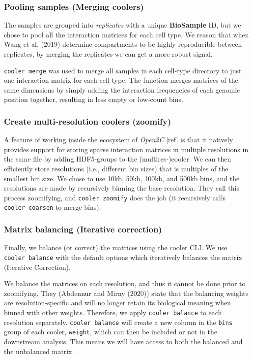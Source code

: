 \documentclass[
  11pt,
  a4paper,
]{scrbook}
\let\oldemph\emph
\renewcommand\emph[1]{\oldemph{\color{gray}#1}}
\begin{document}
\subsubsection{Pooling samples (Merging
coolers)}\label{pooling-samples-merging-coolers}

The samples are grouped into \emph{replicates} with a unique
\textbf{BioSample} ID, but we chose to pool all the interaction matrices
for each cell type. We reason that when Wang et al. (2019) determine
compartments to be highly reproducible between replicates, by merging
the replicates we can get a more robust signal.

\texttt{cooler\ merge} was used to merge all samples in each cell-type
directory to just one interaction matrix for each cell type. The
function merges matrices of the same dimensions by simply adding the
interaction frequencies of each genomic position together, resulting in
less empty or low-count bins.

\subsubsection{Create multi-resolution coolers
(zoomify)}\label{create-multi-resolution-coolers-zoomify}

A feature of working inside the ecosystem of \emph{Open2C} {[}ref{]} is
that it natively provides support for storing sparse interaction
matrices in multiple resolutions in the same file by adding HDF5-groups
to the (multires-)cooler. We can then efficiently store resolutions
(i.e., different bin sizes) that is multiples of the smallest bin size.
We chose to use 10kb, 50kb, 100kb, and 500kb bins, and the resolutions
are made by recursively binning the base resolution. They call this
process zoomifying, and \texttt{cooler\ zoomify} does the job (it
recursively calls \texttt{cooler\ coarsen} to merge bins).

\subsubsection{Matrix balancing (Iterative
correction)}\label{matrix-balancing-iterative-correction}

Finally, we balance (or correct) the matrices using the cooler CLI. We
use \texttt{cooler\ balance} with the default options which iteratively
balances the matrix (Iterative Correction).

We balance the matrices on each resolution, and thus it cannot be done
prior to zoomifying. They (Abdennur and Mirny (2020)) state that the
balancing weights are resolution-specific and will no longer retain its
biological meaning when binned with other weights. Therefore, we apply
\texttt{cooler\ balance} to each resolution separately.
\texttt{cooler\ balance} will create a new column in the \texttt{bins}
group of each cooler, \texttt{weight}, which can then be included or not
in the downstream analysis. This means we will have access to both the
balanced and the unbalanced matrix.
\end{document}
